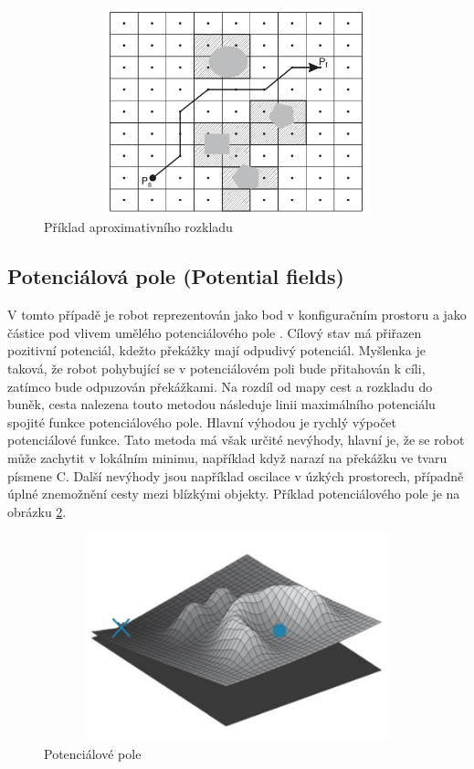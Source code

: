 \begin{enumerate}
		\begin{figure}[h!]
			\begin{center}
				\includegraphics*[width=15cm,height=6cm,keepaspectratio]{obr/aprox}
			\end{center}
			\caption{Příklad aproximativního rozkladu \cite{Tsourdos2010}}
			\label{obr:aprox}
		\end{figure}
		
	\end{enumerate}


\subsection{Potenciálová pole (Potential fields)}
V tomto případě je robot reprezentován jako bod v konfiguračním prostoru a jako částice pod vlivem umělého potenciálového pole \cite{Tsourdos2010,Wallar2014,Masehian2004}. Cílový stav má přiřazen pozitivní potenciál, kdežto překážky mají odpudivý potenciál. Myšlenka je taková, že robot pohybující se v potenciálovém poli bude přitahován k cíli, zatímco bude odpuzován překážkami. Na rozdíl od mapy cest a rozkladu do buněk, cesta nalezena touto metodou následuje linii maximálního potenciálu spojité funkce potenciálového pole. Hlavní výhodou je rychlý výpočet potenciálové funkce. Tato metoda má však určité nevýhody, hlavní je, že se robot může zachytit v lokálním minimu, například když
narazí na překážku ve tvaru písmene C. Další nevýhody jsou například oscilace v úzkých prostorech, případně úplné znemožnění cesty mezi blízkými objekty. Příklad potenciálového pole je na obrázku \ref{obr:potential}.

\begin{figure}[h!]
	\begin{center}
		\includegraphics*[width=15cm,height=6cm,keepaspectratio]{obr/potential}
	\end{center}
	\caption{Potenciálové pole \cite{Opfer20111202}}
	\label{obr:potential}
\end{figure} 


